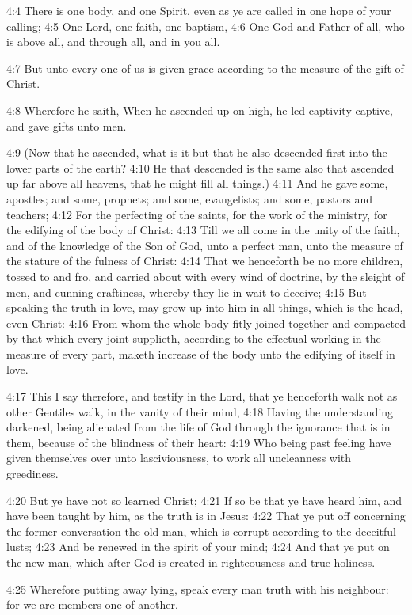 4:4 There is one body, and one Spirit, even as ye are called in one hope of your calling; 4:5 One Lord, one faith, one baptism, 4:6 One God and Father of all, who is above all, and through all, and in you all.

4:7 But unto every one of us is given grace according to the measure of the gift of Christ.

4:8 Wherefore he saith, When he ascended up on high, he led captivity captive, and gave gifts unto men.

4:9 (Now that he ascended, what is it but that he also descended first into the lower parts of the earth?  4:10 He that descended is the same also that ascended up far above all heavens, that he might fill all things.)  4:11 And he gave some, apostles; and some, prophets; and some, evangelists; and some, pastors and teachers; 4:12 For the perfecting of the saints, for the work of the ministry, for the edifying of the body of Christ: 4:13 Till we all come in the unity of the faith, and of the knowledge of the Son of God, unto a perfect man, unto the measure of the stature of the fulness of Christ: 4:14 That we henceforth be no more children, tossed to and fro, and carried about with every wind of doctrine, by the sleight of men, and cunning craftiness, whereby they lie in wait to deceive; 4:15 But speaking the truth in love, may grow up into him in all things, which is the head, even Christ: 4:16 From whom the whole body fitly joined together and compacted by that which every joint supplieth, according to the effectual working in the measure of every part, maketh increase of the body unto the edifying of itself in love.

4:17 This I say therefore, and testify in the Lord, that ye henceforth walk not as other Gentiles walk, in the vanity of their mind, 4:18 Having the understanding darkened, being alienated from the life of God through the ignorance that is in them, because of the blindness of their heart: 4:19 Who being past feeling have given themselves over unto lasciviousness, to work all uncleanness with greediness.

4:20 But ye have not so learned Christ; 4:21 If so be that ye have heard him, and have been taught by him, as the truth is in Jesus: 4:22 That ye put off concerning the former conversation the old man, which is corrupt according to the deceitful lusts; 4:23 And be renewed in the spirit of your mind; 4:24 And that ye put on the new man, which after God is created in righteousness and true holiness.

4:25 Wherefore putting away lying, speak every man truth with his neighbour: for we are members one of another.

